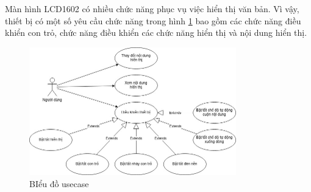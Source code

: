 Màn hình LCD1602 có nhiều chức năng phục vụ việc hiển thị văn bản. Vì vậy, thiết bị có một số yêu cầu chức năng trong hình \ref{func-req} bao gồm các chức năng điều khiển con trỏ, chức năng điều khiển các chức năng hiển thị và nội dung hiển thị.
\begin{figure}[H]
	\centering
	\includegraphics[width=0.8\textwidth]{../images/linux-usecase.jpg}
	\caption{BIểu đồ usecase}
	\label{func-req}
\end{figure}